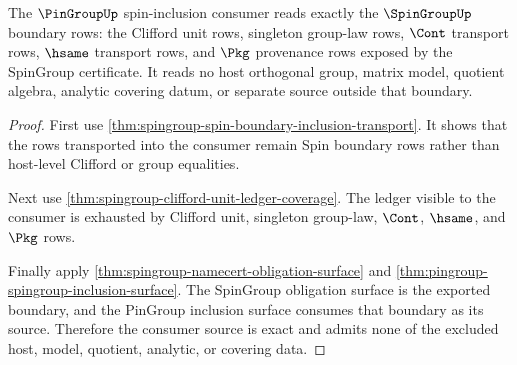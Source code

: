 \begin{theorem}
\label{thm:spingroup-pin-consumer-source-exactness}
The $\PinGroupUp$ spin-inclusion consumer reads exactly the $\SpinGroupUp$
boundary rows: the Clifford unit rows, singleton group-law rows, $\Cont$
transport rows, $\hsame$ transport rows, and $\Pkg$ provenance rows exposed by
the SpinGroup certificate. It reads no host orthogonal group, matrix model,
quotient algebra, analytic covering datum, or separate source outside that
boundary.
\end{theorem}
\begin{proof}
First use \autoref{thm:spingroup-spin-boundary-inclusion-transport}. It shows
that the rows transported into the consumer remain Spin boundary rows rather
than host-level Clifford or group equalities.

Next use \autoref{thm:spingroup-clifford-unit-ledger-coverage}. The ledger
visible to the consumer is exhausted by Clifford unit, singleton group-law,
$\Cont$, $\hsame$, and $\Pkg$ rows.

Finally apply \autoref{thm:spingroup-namecert-obligation-surface} and
\autoref{thm:pingroup-spingroup-inclusion-surface}. The SpinGroup obligation
surface is the exported boundary, and the PinGroup inclusion surface consumes
that boundary as its source. Therefore the consumer source is exact and admits
none of the excluded host, model, quotient, analytic, or covering data.
\end{proof}

